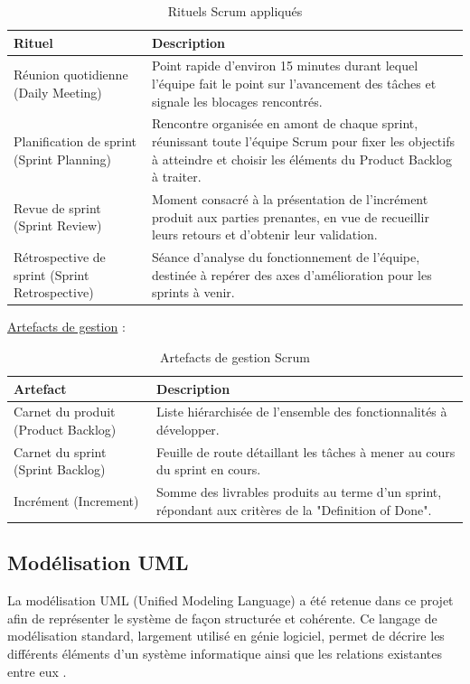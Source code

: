 \begin{table}[h]
\centering
\begin{tabular}{|p{4cm}|p{10cm}|}
\hline
\textbf{Rituel} & \textbf{Description} \\ \hline
Réunion quotidienne (Daily Meeting) & Point rapide d'environ 15 minutes durant lequel l'équipe fait le point sur l'avancement des tâches et signale les blocages rencontrés. \\ \hline
Planification de sprint (Sprint Planning) & Rencontre organisée en amont de chaque sprint, réunissant toute l'équipe Scrum pour fixer les objectifs à atteindre et choisir les éléments du Product Backlog à traiter. \\ \hline
Revue de sprint (Sprint Review) & Moment consacré à la présentation de l'incrément produit aux parties prenantes, en vue de recueillir leurs retours et d'obtenir leur validation. \\ \hline
Rétrospective de sprint (Sprint Retrospective) & Séance d'analyse du fonctionnement de l'équipe, destinée à repérer des axes d'amélioration pour les sprints à venir. \\ \hline
\end{tabular}
\caption{Rituels Scrum appliqués}
\end{table}

\newpage
\underline{Artefacts de gestion} :

\begin{table}[h]
\centering
\begin{tabular}{|p{4cm}|p{10cm}|}
\hline
\textbf{Artefact} & \textbf{Description} \\ \hline
Carnet du produit (Product Backlog) & Liste hiérarchisée de l'ensemble des fonctionnalités à développer. \\ \hline
Carnet du sprint (Sprint Backlog) & Feuille de route détaillant les tâches à mener au cours du sprint en cours. \\ \hline
Incrément (Increment) & Somme des livrables produits au terme d'un sprint, répondant aux critères de la "Definition of Done". \\ \hline
\end{tabular}
\caption{Artefacts de gestion Scrum}
\end{table}

\subsection{Modélisation UML}
La modélisation UML (Unified Modeling Language) a été retenue dans ce projet afin de représenter le système de façon structurée et cohérente. Ce langage de modélisation standard, largement utilisé en génie logiciel, permet de décrire les différents éléments d’un système informatique ainsi que les relations existantes entre eux \parencite{uml_omg}.

